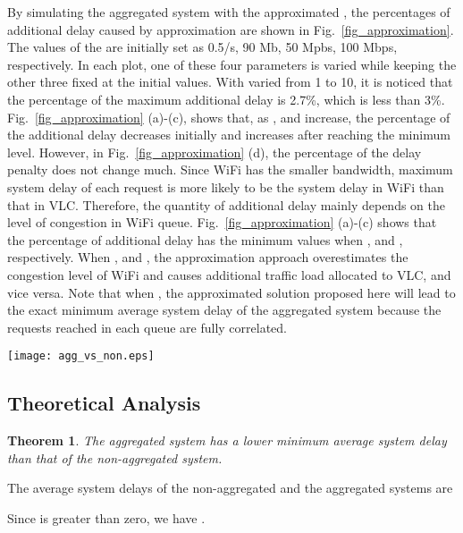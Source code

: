 \documentclass[10pt,journal]{IEEEtran}
\newtheorem{theorem}{Theorem}
\begin{document}
By simulating the aggregated system with the approximated , the percentages of additional delay caused by approximation are shown in Fig.~\ref{fig_approximation}. The values of the  are initially set as 0.5/s, 90 Mb, 50 Mpbs, 100 Mbps, respectively. In each plot, one of these four parameters is varied while keeping the other three fixed at the initial values. With  varied from 1 to 10, it is noticed that the percentage of the maximum additional delay is 2.7\%, which is less than 3\%. Fig.~\ref{fig_approximation} (a)-(c), shows that, as ,  and  increase, the percentage of the additional delay decreases initially and increases after reaching the minimum level. However, in Fig.~\ref{fig_approximation} (d), the percentage of the delay penalty does not change much. Since WiFi has the smaller bandwidth, maximum system delay of each request is more likely to be the system delay in WiFi than that in VLC. Therefore, the quantity of additional delay mainly depends on the level of congestion in WiFi queue. Fig.~\ref{fig_approximation} (a)-(c) shows that the percentage of additional delay has the minimum values  when ,  and , respectively. When ,  and , the approximation approach overestimates the congestion level of WiFi and causes additional traffic load allocated to VLC, and vice versa. Note that when , the approximated solution proposed here will lead to the exact minimum average system delay of the aggregated system because the requests reached in each queue are fully correlated.

\begin{figure*}
\centering
\texttt{[image: agg\_vs\_non.eps]}
\vspace{-10pt}
\caption{The ratio of the approximated minimum average system delay of the aggregated system to the minimum average system delay of the non-aggregated system in terms of (a) ; (b) ; (c) ; (d) , with  varied from 1 to 10}
\label{fig_agg_vs_non}
\vspace{-8pt}
\end{figure*}

\subsection{Theoretical Analysis}
\begin{theorem}
The aggregated system has a lower minimum average system delay than that of the non-aggregated system.
\end{theorem}

\begin{IEEEproof}
The average system delays of the non-aggregated and the aggregated systems are

\vspace{-0.5cm}


Since  is greater than zero, we have .

\end{IEEEproof}
\end{document}
